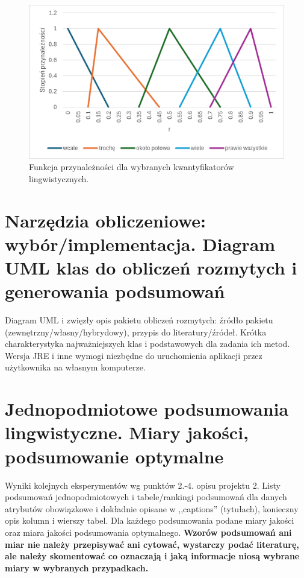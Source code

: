 \documentclass{article}
\begin{document}
        \begin{figure}[H]
    \centering
    \includegraphics[width=\textwidth]{img/a.png}
    \caption{Funkcja przynależności dla wybranych kwantyfikatorów lingwistycznych.}
    \end{figure}

\section{Narzędzia obliczeniowe: wybór/implementacja. Diagram UML klas do obliczeń rozmytych i generowania podsumowań}

Diagram UML i zwięzły opis pakietu obliczeń rozmytych: źródło pakietu
(zewnętrzny/własny/hybrydowy), przypis do literatury/źródeł. Krótka charakterystyka
najważniejszych klas i podstawowych dla zadania ich metod. \\

Wersja JRE i inne wymogi niezbędne do uruchomienia aplikacji przez użytkownika na własnym komputerze. 

\section{ Jednopodmiotowe podsumowania lingwistyczne. Miary jakości, podsumowanie optymalne}
Wyniki kolejnych eksperymentów wg punktów 2.-4. opisu projektu 2.  Listy podsumowań
jednopodmiotowych i tabele/rankingi podsumowań dla danych atrybutów obowiązkowe i dokładnie opisane w ,,captions'' (tytułach), konieczny opis kolumn i wierszy tabel. Dla każdego podsumowania podane miary jakości oraz miara jakości podsumowania
optymalnego. {\bf Wzorów podsumowań ani miar nie należy przepisywać ani cytować, wystarczy podać literaturę, ale
należy skomentować co oznaczają i jaką informacje niosą wybrane miary w wybranych
przypadkach.}\\
\end{document}
